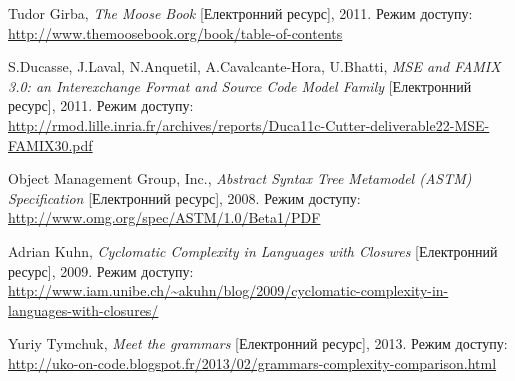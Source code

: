 \documentclass[12pt,a4paper]{article}
\begin{document}
\clearpage

\begin{thebibliography}{9}

Tudor Girba, \emph{The Moose Book} [Електронний ресурс],
    2011. Режим доступу:
    \url{http://www.themoosebook.org/book/table-of-contents}

S.Ducasse, J.Laval, N.Anquetil, A.Cavalcante-Hora, U.Bhatti, \emph{MSE and FAMIX 3.0: an Interexchange Format and Source Code Model Family} [Електронний ресурс], 2011. Режим доступу:
    \url{http://rmod.lille.inria.fr/archives/reports/Duca11c-Cutter-deliverable22-MSE-FAMIX30.pdf}
    
Object Management Group, Inc., \emph{Abstract Syntax Tree Metamodel (ASTM) Specification} [Електронний ресурс], 2008. Режим доступу:
    \url{http://www.omg.org/spec/ASTM/1.0/Beta1/PDF}

Adrian Kuhn, \emph{Cyclomatic Complexity in Languages with Closures} [Електронний ресурс], 2009. Режим доступу:
    \url{http://www.iam.unibe.ch/~akuhn/blog/2009/cyclomatic-complexity-in-languages-with-closures/}

Yuriy Tymchuk, \emph{Meet the grammars} [Електронний ресурс], 2013. Режим доступу:
    \url{http://uko-on-code.blogspot.fr/2013/02/grammars-complexity-comparison.html}

\end{thebibliography}
\end{document}
